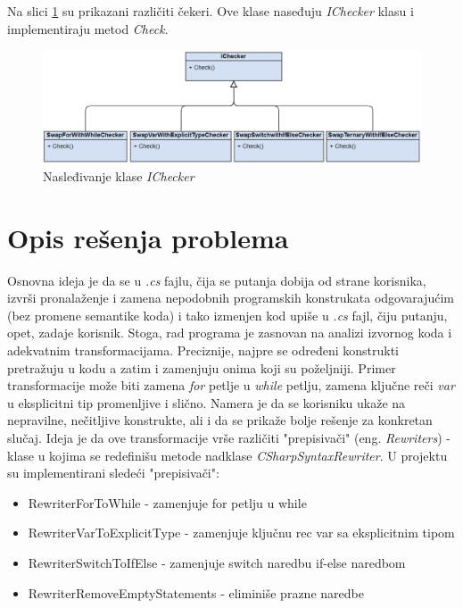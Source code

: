 \documentclass[a4paper]{article}
\begin{document}
{		Na slici \ref{fig:IChecker} su prikazani različiti čekeri. Ove klase naseđuju \textit{IChecker} klasu i implementiraju metod \textit{Check}.
		
		\begin{figure}[!htb]
			\begin{center}
				\includegraphics[scale=0.5]{images/IChecker.png}
			\end{center}
			\caption{Nasleđivanje klase \textit{IChecker}}
			\label{fig:IChecker}
		\end{figure}
		
		
		\section{Opis rešenja problema}
		\label{sec:opis_resenja_problema}
		
		Osnovna ideja je da se u \textit{.cs} fajlu, čija se putanja dobija od strane korisnika, izvrši pronalaženje i zamena nepodobnih programskih konstrukata odgovarajućim (bez promene semantike koda) i tako izmenjen kod upiše u \textit{.cs} fajl, čiju putanju, opet, zadaje korisnik. Stoga, rad programa je zasnovan na analizi izvornog koda i adekvatnim transformacijama. Preciznije, najpre se određeni konstrukti pretražuju u kodu a zatim i zamenjuju onima koji su poželjniji. Primer transformacije može biti zamena \textit{for} petlje u \textit{while} petlju, zamena ključne reči \textit{var} u eksplicitni tip promenljive i slično. Namera je da se korisniku ukaže na nepravilne, nečitljive konstrukte, ali i da se prikaže bolje rešenje za konkretan slučaj. Ideja je da ove transformacije vrše različiti "prepisivači" (eng. \textit{Rewriters}) - klase u kojima se redefinišu metode nadklase \textit{CSharpSyntaxRewriter}. U projektu su implementirani sledeći "prepisivači":
		\begin{itemize}
			\item RewriterForToWhile - zamenjuje for petlju u while
			\item RewriterVarToExplicitType - zamenjuje ključnu rec var sa eksplicitnim tipom
			\item RewriterSwitchToIfElse - zamenjuje switch naredbu if-else naredbom
			\item RewriterRemoveEmptyStatements - eliminiše prazne naredbe
		\end{itemize}
		
}
\end{document}

